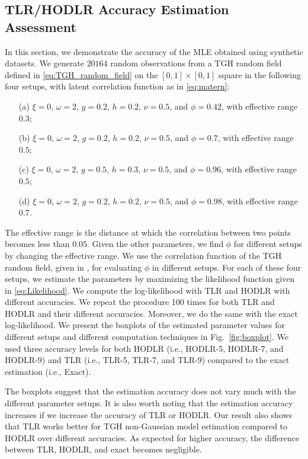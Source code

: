 \documentclass[conference]{IEEEtran}
\begin{document}
\subsection{TLR/HODLR Accuracy Estimation Assessment}
In this section, we demonstrate the accuracy of the MLE obtained using synthetic datasets. We generate $20164$ random observations from a TGH random field defined in \eqref{eq:TGH_random_field} on the  $[0,1]\times[0,1]$ square in the following four setups, with latent correlation function as in \eqref{eq:matern}:
\begin{enumerate}
\item[(a)] $\xi = 0$, $\omega = 2$, $g = 0.2$, $h = 0.2$, $\nu = 0.5$, and $\phi = 0.42$, with effective range $0.3$;
\item[(b)] $\xi = 0$, $\omega = 2$, $g = 0.2$, $h = 0.2$, $\nu = 0.5$, and $\phi = 0.7$, with effective range $0.5$;
\item[(c)] $\xi = 0$, $\omega = 2$, $g = 0.5$, $h = 0.3$, $\nu = 0.5$, and $\phi = 0.96$, with effective range $0.5$;
\item[(d)] $\xi = 0$, $\omega = 2$, $g = 0.2$, $h = 0.2$, $\nu = 0.5$, and $\phi = 0.98$, with effective range $0.7$.
\end{enumerate}


The effective range is the distance at which the correlation between two points becomes less than $0.05$. Given the other parameters, we find $\phi$ for different setups by changing the effective range. We use the correlation function of the TGH random field, given in \cite{xu2017tukey}, for evaluating $\phi$ in different setups. 
For each of these four setups, we estimate the parameters by maximizing the likelihood function given in \eqref{eq:Likelihood}. We compute the log-likelihood with TLR and HODLR with different accuracies. We repeat the procedure 100 times for both TLR and HODLR and their different accuracies. Moreover, we do the same with the exact log-likelihood. We present the boxplots of the estimated parameter values for different setups and different computation techniques in Fig.~\ref{fig:boxplot}. We used three accuracy levels for both HODLR (i.e., HODLR-5, HODLR-7, and HODLR-9) and TLR (i.e., TLR-5, TLR-7, and TLR-9) compared to the exact estimation (i.e., Exact).


The boxplots suggest that the estimation accuracy does not vary much with the different parameter setups. It is also worth noting that the estimation accuracy increases if we increase the accuracy of TLR or HODLR. Our result also shows that TLR works better for TGH non-Gaussian model estimation compared to HODLR over different accuracies. As expected for higher accuracy, the difference between TLR, HODLR, and exact becomes negligible.
\end{document}
